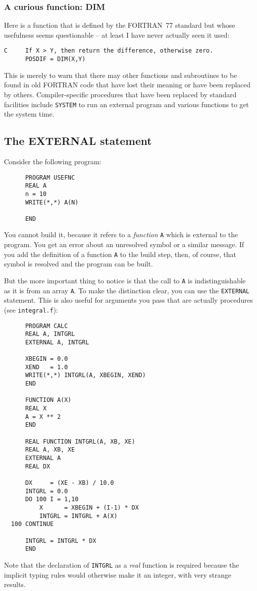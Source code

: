 \subsubsection{A curious function: DIM}
Here is a function that is defined by the FORTRAN~77 standard but whose usefulness
seems questionable -- at least I have never actually seen it used:
%
\begin{verbatim}
C     If X > Y, then return the difference, otherwise zero.
      POSDIF = DIM(X,Y)
\end{verbatim}

This is merely to warn that there may other functions and subroutines to be found
in old FORTRAN code that have lost their meaning or have been replaced by others.
Compiler-specific procedures that have been replaced by standard facilities include
\verb+SYSTEM+ to run an external program and various functions to get the system time.


\subsection{The EXTERNAL statement}
Consider the following program:
%
\begin{verbatim}
      PROGRAM USEFNC
      REAL A
      n = 10
      WRITE(*,*) A(N)

      END
\end{verbatim}

You cannot build it, because it refers to a \emph{function} \verb+A+ which is external
to the program. You get an error about an unresolved symbol or a similar message.
If you add the definition of a function \verb+A+ to the build step, then, of course,
that symbol is resolved and the program can be built.

But the more important thing to notice is that the call to \verb+A+ is indistinguishable
as it is from an array \verb+A+. To make the distinction clear, you can use the
\verb+EXTERNAL+ statement. This is also useful for arguments you pass that are actually
procedures (see \verb+integral.f+):
%
\begin{verbatim}
      PROGRAM CALC
      REAL A, INTGRL
      EXTERNAL A, INTGRL

      XBEGIN = 0.0
      XEND   = 1.0
      WRITE(*,*) INTGRL(A, XBEGIN, XEND)
      END

      FUNCTION A(X)
      REAL X
      A = X ** 2
      END

      REAL FUNCTION INTGRL(A, XB, XE)
      REAL A, XB, XE
      EXTERNAL A
      REAL DX

      DX     = (XE - XB) / 10.0
      INTGRL = 0.0
      DO 100 I = 1,10
          X      = XBEGIN + (I-1) * DX
          INTGRL = INTGRL + A(X)
  100 CONTINUE

      INTGRL = INTGRL * DX
      END
\end{verbatim}
%
Note that the declaration of \verb+INTGRL+ as a \emph{real} function is required
because the implicit typing rules would otherwise make it an integer, with very
strange results.

